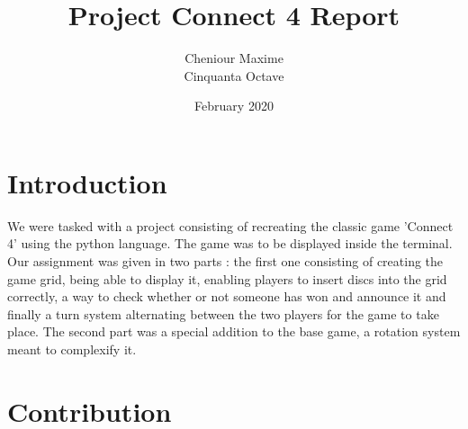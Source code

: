 \documentclass{article}
\title{Project Connect 4 Report}
\author{Cheniour Maxime \\ Cinquanta Octave}
\date{February 2020}
\begin{document}
\maketitle

\tableofcontents

\section{Introduction}

We were tasked with a project consisting of recreating the classic game 'Connect 4' using the python language. The game was to be displayed inside the terminal. Our assignment was given in two parts : the first one consisting of creating the game grid, being able to display it, enabling players to insert discs into the grid correctly, a way to check whether or not someone has won and announce it and finally a turn system alternating between the two players for the game to take place. The second part was a special addition to the base game, a rotation system meant to complexify it. 

\section{Contribution}
\end{document}

